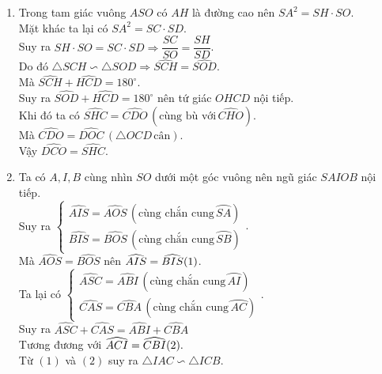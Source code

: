 \begin{ex}
{\begin{enumerate}
			Do đó $\triangle SAC \backsim \triangle SDA$, suy ra 
			$$\dfrac{SA}{SD} = \dfrac{SC}{SA} \Rightarrow SA^2 = SD \cdot SC.$$
			\item Trong tam giác vuông $ASO$ có $AH$ là đường cao nên $SA^2 = SH \cdot SO$.\\
			 Mặt khác ta lại có $SA^2 = SC \cdot SD$.\\
			  Suy ra $SH \cdot SO = SC \cdot SD \Rightarrow \dfrac{SC}{SO} = \dfrac{SH}{SD}$.\\
			  Do đó $\triangle SCH \backsim \triangle SOD \Rightarrow \widehat{SCH} = \widehat{SOD}$.\\
			  Mà  $\widehat{SCH} + \widehat{HCD} = 180^\circ$.\\
			  Suy ra  $\widehat{SOD} + \widehat{HCD} = 180^\circ$ nên tứ giác $OHCD$ nội tiếp.\\
			 Khi đó ta có $\widehat{SHC}=\widehat{CDO} \,(\text{cùng bù với} \, \widehat{CHO}).$\\
			Mà $\widehat{CDO} = \widehat{DOC} \,(\triangle OCD \, \text{cân}).$\\
			Vậy $\widehat{DCO} = \widehat{SHC}$.
			\item Ta có $A,I,B$ cùng nhìn $SO$ dưới một góc vuông nên ngũ giác $SAIOB$ nội tiếp.\\
			Suy ra $\begin{cases}
			\widehat{AIS}=\widehat{AOS} \,(\text{cùng chắn cung} \, \wideparen{SA}) \\ \widehat{BIS}=\widehat{BOS} \,(\text{cùng chắn cung} \, \wideparen{SB})
			\end{cases}.$\\
			Mà $\widehat{AOS} = \widehat{BOS}$ nên $\widehat{AIS} = \widehat{BIS}  \hfill(1)$.\\
			Ta lại có $\begin{cases}
			\widehat{ASC}=\widehat{ABI} \,(\text{cùng chắn cung} \, \wideparen{AI}) \\ \widehat{CAS}=\widehat{CBA} \,(\text{cùng chắn cung} \, \wideparen{AC})
			\end{cases}.$\\
			Suy ra $\widehat{ASC} + \widehat{CAS} = \widehat{ABI} + \widehat{CBA}$\\
			Tương đương với $\widehat{ACI} = \widehat{CBI} \hfill(2).$\\
			Từ $(1)$ và $(2)$ suy ra $\triangle IAC \backsim \triangle ICB$.
		\end{enumerate}
	}
\end{ex}


